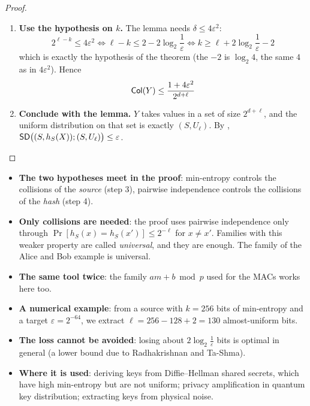 \begin{proof}
\begin{enumerate}
\begin{itemize}
    \end{itemize}
    \item \textbf{Use the hypothesis on $k$.} The lemma needs $\delta \leq 4\varepsilon^2$:
    \[
      2^{\ell - k} \leq 4\varepsilon^2 \iff \ell - k \leq 2 - 2\log_2\frac{1}{\varepsilon} \iff k \geq \ell + 2\log_2\frac{1}{\varepsilon} - 2
    \]
    which is exactly the hypothesis of the theorem (the $-2$ is $\log_2 4$, the same $4$ as in $4\varepsilon^2$). Hence
    \[
      \mathsf{Col}(Y) \leq \frac{1 + 4\varepsilon^2}{2^{d+\ell}}
    \]
    \item \textbf{Conclude with the lemma.} $Y$ takes values in a set of size $2^{d+\ell}$, and the uniform distribution on that set is exactly $(S, U_\ell)$. By , $\mathsf{SD}\big((S, h_S(X)); (S, U_\ell)\big) \leq \varepsilon$. \qedhere
  \end{enumerate}
\end{proof}

\begin{framedobs}{}
  \begin{itemize}
    \item \textbf{The two hypotheses meet in the proof}: min-entropy controls the collisions of the \textit{source} (step 3), pairwise independence controls the collisions of the \textit{hash} (step 4).
    \item \textbf{Only collisions are needed}: the proof uses pairwise independence only through $\Pr[h_S(x) = h_S(x')] \leq 2^{-\ell}$ for $x \neq x'$. Families with this weaker property are called \textit{universal}, and they are enough. The family of the Alice and Bob example is universal.
    \item \textbf{The same tool twice}: the family $am + b \bmod p$ used for the MACs works here too.
    \item \textbf{A numerical example}: from a source with $k = 256$ bits of min-entropy and a target $\varepsilon = 2^{-64}$, we extract $\ell = 256 - 128 + 2 = 130$ almost-uniform bits.
    \item \textbf{The loss cannot be avoided}: losing about $2\log_2\frac{1}{\varepsilon}$ bits is optimal in general (a lower bound due to Radhakrishnan and Ta-Shma).
    \item \textbf{Where it is used}: deriving keys from Diffie--Hellman shared secrets, which have high min-entropy but are not uniform; privacy amplification in quantum key distribution; extracting keys from physical noise.
  \end{itemize}
\end{framedobs}

